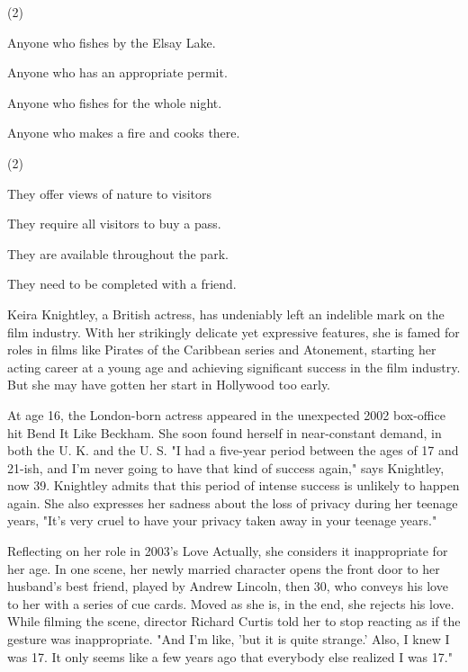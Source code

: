 \documentclass{英语试卷}
\begin{document}
\begin{choices}(2)
  \item Anyone who fishes by the Elsay Lake.
  \item Anyone who has an appropriate permit.
  \item Anyone who fishes for the whole night.
  \item Anyone who makes a fire and cooks there.
\end{choices}
\begin{choices}(2)
  \item They offer views of nature to visitors
  \item They require all visitors to buy a pass.
  \item They are available throughout the park.
  \item They need to be completed with a friend.
\end{choices}
\par Keira Knightley, a British actress, has undeniably left an indelible mark on the film industry. With her strikingly delicate yet expressive features, she is famed for roles in films like Pirates of the Caribbean series and Atonement, starting her acting career at a young age and achieving significant success in the film industry. But she may have gotten her start in Hollywood too early.\par
\par At age 16, the London-born actress appeared in the unexpected 2002 box-office hit Bend It Like Beckham. She soon found herself in near-constant demand, in both the U. K. and the U. S. "I had a five-year period between the ages of 17 and 21-ish, and I'm never going to have that kind of success again," says Knightley, now 39. Knightley admits that this period of intense success is unlikely to happen again. She also expresses her sadness about the loss of privacy during her teenage years, "It's very cruel to have your privacy taken away in your teenage years."\par
\par Reflecting on her role in 2003's Love Actually, she considers it inappropriate for her age. In one scene, her newly married character opens the front door to her husband's best friend, played by Andrew Lincoln, then 30, who conveys his love to her with a series of cue cards. Moved as she is, in the end, she rejects his love. While filming the scene, director Richard Curtis told her to stop reacting as if the gesture was inappropriate. "And I'm like, 'but it is quite strange.' Also, I knew I was 17. It only seems like a few years ago that everybody else realized I was 17."\par
\end{document}
